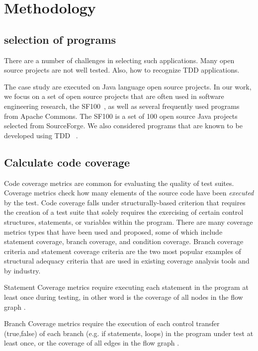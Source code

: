\documentclass[conference]{IEEEtran}
\begin{document}
\section{Methodology}\label{sec:Methodology}

\subsection{selection of programs}
	There are a number of challenges in selecting such applications.  Many open source projects are not well tested. Also, how to recognize TDD applications.
    
    The case study are executed on Java language open source projects. In our work, we focus on a set of open source projects that are often used in software engineering research, the SF100~\cite{bench_sf100}, as well as several frequently used programs from Apache Commons. The SF100 is a set of 100 open source Java projects selected from SourceForge. We also considered programs that are known to be developed using TDD ~\cite{mlevinson:2008}. 

\subsection{Calculate code coverage}
Code coverage metrics are common for evaluating the quality of test suites. Coverage metrics check how many elements of the source code  have been \textit{executed} by the test. Code coverage falls under structurally-based criterion that requires the creation of a test suite that solely requires the exercising of certain control structures, statements, or variables within the program\cite{kapfhammer-testing-handbook}. There are many coverage metrics types that have been used and proposed, some of which include statement coverage, branch coverage, and condition coverage. Branch coverage criteria and statement coverage criteria are the two most popular examples of structural adequacy criteria that are used in existing coverage analysis tools and by industry\cite{weyuker1988evaluation}.

Statement Coverage metrics require executing each statement in the program at least once during testing, in other word is the coverage of all nodes in the flow graph \cite{zhu1997software}.

Branch Coverage metrics require the execution of each control transfer (true,false) of each branch (e.g. if statements, loops)  in the program under test at least once, or the coverage of all edges in the flow graph \cite{zhu1997software}.\\
\end{document}
